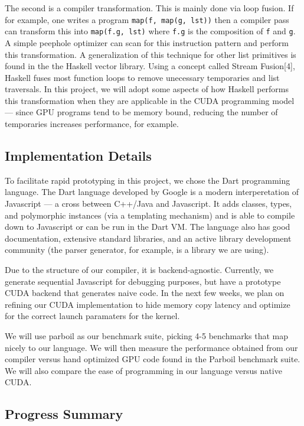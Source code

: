 The second is a compiler transformation. This is mainly done via loop
fusion. If for example, one writes a program
\texttt{map(f, map(g, lst))} then a compiler pass can transform this
into \texttt{map(f.g, lst)} where \texttt{f.g} is the composition of
\texttt{f} and \texttt{g}. A simple peephole optimizer can scan for this
instruction pattern and perform this transformation. A generalization of
this technique for other list primitives is found in the the Haskell
vector library. Using a concept called Stream Fusion{[}4{]}, Haskell
fuses most function loops to remove unecessary temporaries and list
traversals. In this project, we will adopt some aspects of how Haskell
performs this transformation when they are applicable in the CUDA
programming model --- since GPU programs tend to be memory bound,
reducing the number of temporaries increases performance, for example.

\subsection{Implementation Details}

To facilitate rapid prototyping in this project, we chose the Dart
programming language. The Dart language developed by Google is a modern
interperetation of Javascript --- a cross between C++/Java and
Javascript. It adds classes, types, and polymorphic instances (via a
templating mechanism) and is able to compile down to Javascript or can
be run in the Dart VM. The language also has good documentation,
extensive standard libraries, and an active library development
community (the parser generator, for example, is a library we are
using).

Due to the structure of our compiler, it is backend-agnostic. Currently,
we generate sequential Javascript for debugging purposes, but have a
prototype CUDA backend that generates naive code. In the next few weeks,
we plan on refining our CUDA implementation to hide memory copy latency
and optimize for the correct launch paramaters for the kernel.

We will use parboil as our benchmark suite, picking 4-5 benchmarks that
map nicely to our language. We will then measure the performance
obtained from our compiler versus hand optimized GPU code found in the
Parboil benchmark suite. We will also compare the ease of programming in
our language versus native CUDA.

\subsection{Progress Summary}


